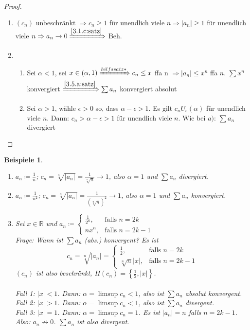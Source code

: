 \documentclass[14pt,titlepage,ngerman,a4paper,headsepline,DIV15,halfparskip*]{scrartcl}
\newcommand{\R}{\mathbb{R}}
\theoremstyle{named}
\theoremstyle{dotless}
\newtheorem*{beispiele}{Beispiele}
\begin{document}
\begin{proof} ~\
	\begin{enumerate}
		\item $(c_{n})$ unbeschränkt $\Rightarrow c_{n} \geq 1$ für unendlich viele $n \Rightarrow |a_{n}| \geq 1$ für unendlich viele $n \Rightarrow a_{n} \rightarrow 0 \xRightarrow[]{\ref{3.1.c:satz}}$ Beh.
		\item  %
			\begin{enumerate}
				\item Sei $\alpha < 1$, sei $x \in (\alpha, 1) \xRightarrow[]{hilfssatz*} c_{n} \leq x$ ffa n $\Rightarrow |a_{n}| \leq x^{n}$ ffa $n$. $\sum x^{n}$ konvergiert $\xRightarrow[]{\ref{3.5.a:satz}} \sum a_{n}$ konvergiert absolut 
				\item Sei $\alpha > 1$, wähle $\epsilon > 0$ so, dass $\alpha - \epsilon > 1$. Es gilt $c_{n} U_{\epsilon}(\alpha)$ für unendlich viele $n$. Dann: $c_{n} > \alpha - \epsilon > 1$ für unendlich viele $n$. Wie bei $a)$: $\sum a_{n}$ divergiert 
			\end{enumerate}
	\end{enumerate}
\end{proof}


\begin{beispiele} ~\
	\begin{enumerate}
		\item $a_{n} \coloneqq \frac{1}{n}$; $c_{n} = \sqrt[n]{|a_{n}|} = \frac{1}{\sqrt[n]{n}} \rightarrow 1$, also $\alpha = 1$ und $\sum a_{n}$ divergiert.
		\item $a_{n} \coloneqq \frac{1}{n^{2}}$; $c_{n} = \sqrt[n]{|a_{n}|} = \frac{1}{(\sqrt[n]{n})^{2}} \rightarrow 1$, also $\alpha = 1$ und $\sum a_{n}$ konvergiert.
		\item Sei $x \in \R$ und $a_{n} \coloneqq \begin{cases} \frac{1}{2^{n}}, & \text{falls } n = 2k \\ n x^{n}, & \text{falls } n = 2k - 1 \end{cases}$ \\
			Frage: Wann ist $\sum a_{n}$ (abs.) konvergent? Es ist
			$$c_{n} = \sqrt[n]{|a_{n}|} = \begin{cases}
				\frac{1}{2}, & \text{falls } n = 2k \\ \sqrt[n]{n}|x|, & \text{falls } n = 2k - 1
			\end{cases}$$
			$(c_{n})$ ist also beschränkt, $H(c_{n}) = \left\{ \frac{1}{2}, |x| \right\}$. \\ \\
			Fall 1: $|x| < 1$. Dann: $\alpha = \limsup c_{n} < 1$, also ist $\sum a_{n}$ absolut konvergent. \\
			Fall 2: $|x| > 1$. Dann: $\alpha = \limsup c_{n} < 1$, also ist $\sum a_{n}$ divergent. \\
			Fall 3: $|x| = 1$. Dann: $\alpha = \limsup c_{n} = 1$. Es ist $|a_{n}| = n$ falls $n = 2k - 1$. Also: $a_{n} \not\rightarrow 0$. $\sum a_{n}$ ist also divergent.			
	\end{enumerate}	
\end{beispiele}
\end{document}
